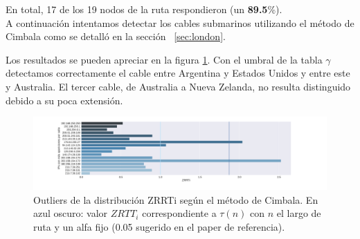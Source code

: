 En total, 17 de los 19 nodos de la ruta respondieron (un \textbf{89.5}\%).
\\

A continuación intentamos detectar los cables submarinos utilizando el método de Cimbala como se detalló en la sección ~\ref{sec:london}.

Los resultados se pueden apreciar en la figura \ref{fig:victoria-zrtt}. Con el umbral de la tabla $\gamma$ detectamos correctamente el cable entre Argentina y Estados Unidos y entre este y Australia. El tercer cable, de Australia a Nueva Zelanda, no resulta distinguido debido a su poca extensión.

\begin{figure}[H]
   \centering
       \includegraphics[width=1\textwidth, height=1\textheight, keepaspectratio]{../img/victoria-ac-nz-zrtt}
 \caption{Outliers de la distribución ZRRTi según el método de Cimbala. En azul oscuro: valor $ZRTT_i$ correspondiente a $\tau(n)$ con $n$ el largo de ruta y un alfa fijo (0.05 sugerido en el paper de referencia).}
 \label{fig:victoria-zrtt}
\end{figure}

